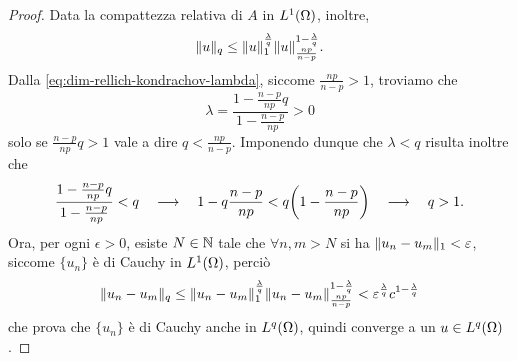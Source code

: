 \begin{proof}
    Data la compattezza relativa di $A$ in $\leb[1]{\Omega}$, inoltre,
    \begin{equation}
        \norm{u}_q\le\norm{u}_1^\frac{\lambda}{q}\norm{u}_\frac{np}{n-p}^{1-\frac{\lambda}{q}}.
    \end{equation}
    Dalla \eqref{eq:dim-rellich-kondrachov-lambda}, siccome $\frac{np}{n-p}>1$, troviamo che
    \begin{equation}
        \lambda=\frac{1-\frac{n-p}{np}q}{1-\frac{n-p}{np}}>0
    \end{equation}
    solo se $\frac{n-p}{np}q>1$ vale a dire $q<\frac{np}{n-p}$.
    Imponendo dunque che $\lambda<q$ risulta inoltre che
    \begin{equation}
        \frac{1-\frac{n-p}{np}q}{1-\frac{n-p}{np}}<q
        \qqq
        1-q\frac{n-p}{np}<q\biggl(1-\frac{n-p}{np}\biggr)
        \qqq
        q>1.
    \end{equation}
    Ora, per ogni $\epsilon>0$, esiste $N\in\N$ tale che $\forall n,m>N$ si ha $\norm{u_n-u_m}_1<\epsilon$, siccome $\{u_n\}$ è di Cauchy in $\leb[1]{\Omega}$, perciò
    \begin{equation}
        \norm{u_n-u_m}_q\le
        \norm{u_n-u_m}_1^\frac{\lambda}{q}\norm{u_n-u_m}_\frac{np}{n-p}^{1-\frac{\lambda}{q}}<\epsilon^\frac{\lambda}{q}c^{1-\frac{\lambda}{q}}
    \end{equation}
    che prova che $\{u_n\}$ è di Cauchy anche in $\leb[q]{\Omega}$, quindi converge a un $u\in\leb[q]{\Omega}$.
\end{proof}
